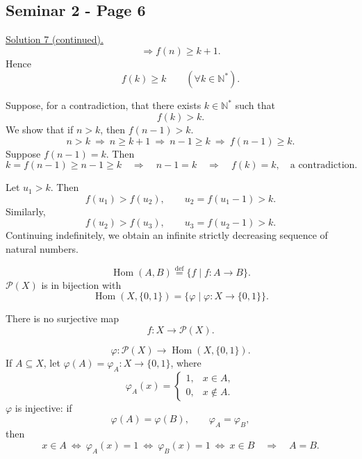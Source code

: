 
\subsection*{Seminar 2 - Page 6}

\noindent\underline{Solution 7 (continued).}
\[
\Longrightarrow f(n)\geq k+1.
\]
\noindent Hence
\[
 f(k)\geq k\qquad (\forall k\in\mathbb{N}^{*}).
\]

\noindent Suppose, for a contradiction, that there exists
$k\in\mathbb{N}^{*}$ such that
\[
 f(k)>k.
\]
\noindent We show that if $n>k$, then $f(n-1)>k$.
\[
 n>k\ \Longrightarrow\ n\geq k+1\ \Longrightarrow\ n-1\geq k
 \ \Longrightarrow\ f(n-1)\geq k.
\]
\noindent Suppose $f(n-1)=k$. Then
\[
 k=f(n-1)\geq n-1\geq k
 \quad\Longrightarrow\quad n-1=k
 \quad\Longrightarrow\quad f(k)=k,\quad\text{a contradiction}.
\]

\noindent Let $u_1>k$. Then
\[
 f(u_1)>f(u_2),\qquad u_2=f(u_1-1)>k.
\]
\noindent Similarly,
\[
 f(u_2)>f(u_3),\qquad u_3=f(u_2-1)>k.
\]
\noindent Continuing indefinitely, we obtain an infinite strictly
 decreasing sequence of natural numbers.

\bigskip
\noindent{}\quad
\[
 \operatorname{Hom}(A,B)\overset{\mathrm{def}}{=}
 \{f\mid f:A\longrightarrow B\}.
\]
\noindent $\mathcal{P}(X)$ is in bijection with
\[
 \operatorname{Hom}(X,\{0,1\})
   =\{\varphi\mid\varphi:X\longrightarrow\{0,1\}\}.
\]

\medskip
\noindent{}\quad There is no surjective map
\[
 f:X\longrightarrow\mathcal{P}(X).
\]

\medskip
\noindent{}\quad
\[
 \varphi:\mathcal{P}(X)\longrightarrow
 \operatorname{Hom}(X,\{0,1\}).
\]
\noindent If $A\subseteq X$, let
$\varphi(A)=\varphi_A:X\longrightarrow\{0,1\}$, where
\[
 \varphi_A(x)=
 \begin{cases}
  1,&x\in A,\\
  0,&x\notin A.
 \end{cases}
\]
\noindent $\varphi$ is injective: if
\[
 \varphi(A)=\varphi(B),\qquad \varphi_A=\varphi_B,
\]
\noindent then
\[
 x\in A\ \Longleftrightarrow\ \varphi_A(x)=1
 \ \Longleftrightarrow\ \varphi_B(x)=1
 \ \Longleftrightarrow\ x\in B
 \quad\Longrightarrow\quad A=B.
\]
